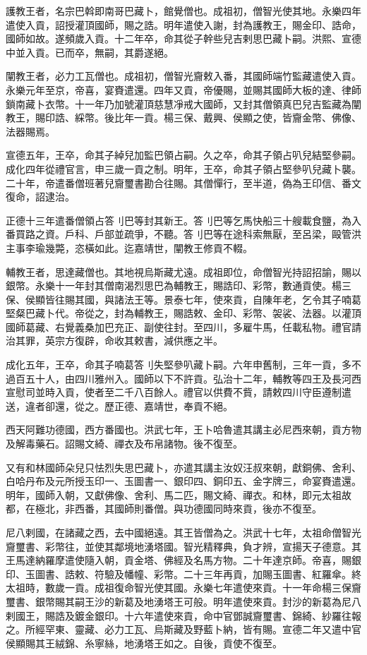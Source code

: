 \begin{pinyinscope}
護教王者，名宗巴斡即南哥巴藏卜，館覺僧也。成祖初，僧智光使其地。永樂四年遣使入貢，詔授灌頂國師，賜之誥。明年遣使入謝，封為護教王，賜金印、誥命，國師如故。遂頻歲入貢。十二年卒，命其從子幹些兒吉剌思巴藏卜嗣。洪熙、宣德中並入貢。已而卒，無嗣，其爵遂絕。

闡教王者，必力工瓦僧也。成祖初，僧智光齎敕入番，其國師端竹監藏遣使入貢。永樂元年至京，帝喜，宴賚遣還。四年又貢，帝優賜，並賜其國師大板的達、律師鎖南藏卜衣幣。十一年乃加號灌頂慈慧凈戒大國師，又封其僧領真巴兒吉監藏為闡教王，賜印誥、綵幣。後比年一貢。楊三保、戴興、侯顯之使，皆齎金幣、佛像、法器賜焉。

宣德五年，王卒，命其子綽兒加監巴領占嗣。久之卒，命其子領占叭兒結堅參嗣。成化四年從禮官言，申三歲一貢之制。明年，王卒，命其子領占堅參叭兒藏卜襲。二十年，帝遣番僧班著兒齎璽書勘合往賜。其僧憚行，至半道，偽為王印信、番文復命，詔逮治。

正德十三年遣番僧領占答刂巴等封其新王。答刂巴等乞馬快船三十艘載食鹽，為入番買路之資。戶科、戶部並疏爭，不聽。答刂巴等在途科索無厭，至呂梁，毆管洪主事李瑜幾斃，恣橫如此。迄嘉靖世，闡教王修貢不輟。

輔教王者，思達藏僧也。其地視烏斯藏尤遠。成祖即位，命僧智光持詔招諭，賜以銀幣。永樂十一年封其僧南渴烈思巴為輔教王，賜誥印、彩幣，數通貢使。楊三保、侯顯皆往賜其國，與諸法王等。景泰七年，使來貢，自陳年老，乞令其子喃葛堅粲巴藏卜代。帝從之，封為輔教王，賜誥敕、金印、彩幣、袈裟、法器。以灌頂國師葛藏、右覺義桑加巴充正、副使往封。至四川，多雇牛馬，任載私物。禮官請治其罪，英宗方復辟，命收其敕書，減供應之半。

成化五年，王卒，命其子喃葛答刂失堅參叭藏卜嗣。六年申舊制，三年一貢，多不過百五十人，由四川雅州入。國師以下不許貢。弘治十二年，輔教等四王及長河西宣慰司並時入貢，使者至二千八百餘人。禮官以供費不貲，請敕四川守臣遵制遣送，違者卻還，從之。歷正德、嘉靖世，奉貢不絕。

西天阿難功德國，西方番國也。洪武七年，王卜哈魯遣其講主必尼西來朝，貢方物及解毒藥石。詔賜文綺、禪衣及布帛諸物。後不復至。

又有和林國師朵兒只怯烈失思巴藏卜，亦遣其講主汝奴汪叔來朝，獻銅佛、舍利、白哈丹布及元所授玉印一、玉圖書一、銀印四、銅印五、金字牌三，命宴賚遣還。明年，國師入朝，又獻佛像、舍利、馬二匹，賜文綺、禪衣。和林，即元太祖故都，在極北，非西番，其國師則番僧。與功德國同時來貢，後亦不復至。

尼八剌國，在諸藏之西，去中國絕遠。其王皆僧為之。洪武十七年，太祖命僧智光齎璽書、彩幣往，並使其鄰境地湧塔國。智光精釋典，負才辨，宣揚天子德意。其王馬達納羅摩遣使隨入朝，貢金塔、佛經及名馬方物。二十年達京師。帝喜，賜銀印、玉圖書、誥敕、符驗及幡幢、彩幣。二十三年再貢，加賜玉圖書、紅羅傘。終太祖時，數歲一貢。成祖復命智光使其國。永樂七年遣使來貢。十一年命楊三保齎璽書、銀幣賜其嗣王沙的新葛及地湧塔王可般。明年遣使來貢。封沙的新葛為尼八剌國王，賜誥及鍍金銀印。十六年遣使來貢，命中官鄧誠齎璽書、錦綺、紗羅往報之。所經罕東、靈藏、必力工瓦、烏斯藏及野藍卜納，皆有賜。宣德二年又遣中官侯顯賜其王絨錦、糸寧絲，地湧塔王如之。自後，貢使不復至。


\end{pinyinscope}

